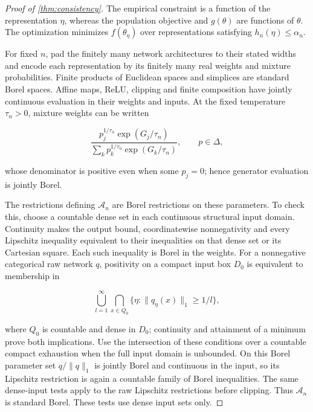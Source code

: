 \begin{proof}[Proof of \cref{thm:consistency}]
The empirical constraint is a function of the representation $\eta$, whereas the population objective and $g(\theta)$ are functions of $\theta$. The optimization minimizes $f(\theta_\eta)$ over representations satisfying $h_n(\eta)\leqslant\alpha_n$. 

For fixed $n$, pad the finitely many network architectures to their stated widths and encode each representation by its finitely many real weights and mixture probabilities. Finite products of Euclidean spaces and simplices are standard Borel spaces. Affine maps, ReLU, clipping and finite composition have jointly continuous evaluation in their weights and inputs. At the fixed temperature $\tau_n>0$, mixture weights can be written

\[
\frac{p_j^{1/\tau_n}\exp(G_j/\tau_n)}{\sum_k p_k^{1/\tau_n}\exp(G_k/\tau_n)},\qquad p\in\Delta,
\]

whose denominator is positive even when some $p_j=0$; hence generator evaluation is jointly Borel. 

The restrictions defining $\mathcal A_n$ are Borel restrictions on these parameters. To check this, choose a countable dense set in each continuous structural input domain. Continuity makes the output bound, coordinatewise nonnegativity and every Lipschitz inequality equivalent to their inequalities on that dense set or its Cartesian square. Each such inequality is Borel in the weights. For a nonnegative categorical raw network $q$, positivity on a compact input box $D_0$ is equivalent to membership in

\[
\bigcup_{l=1}^\infty\bigcap_{x\in Q_0}\{\eta:\|q_\eta(x)\|_1\geqslant1/l\},
\]

where $Q_0$ is countable and dense in $D_0$; continuity and attainment of a minimum prove both implications. Use the intersection of these conditions over a countable compact exhaustion when the full input domain is unbounded. On this Borel parameter set $q/\|q\|_1$ is jointly Borel and continuous in the input, so its Lipschitz restriction is again a countable family of Borel inequalities. The same dense-input tests apply to the raw Lipschitz restrictions before clipping. Thus $\mathcal A_n$ is standard Borel. These tests use dense input sets only. 


\end{proof}
